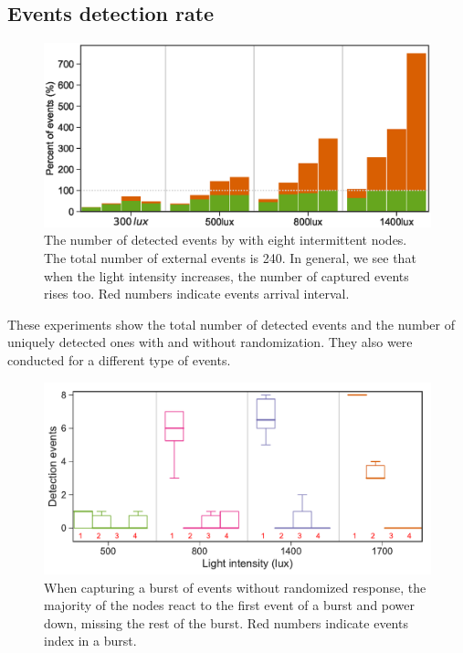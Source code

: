 \subsection{Events detection rate}
%
\begin{figure}[t]
		\centering
	    \includegraphics[width=\columnwidth]{figures/regular_events_capture_rate.eps}
    	\caption{The number of detected events by \fullcim with eight intermittent nodes. The total number of external events is 240. In general, we see that when the light intensity increases, the number of captured events rises too. Red numbers indicate events arrival interval.}
    	\label{fig:events_detection_rate}
\end{figure} 
These experiments show the total number of detected events and the number of uniquely detected ones with and without randomization. They also were conducted for a different type of events. 
%
\begin{figure}[t]
    \includegraphics[width=\columnwidth]{figures/events_burst_problem.pdf}
	\caption{When capturing a burst of events without randomized response, the majority of the nodes react to the first event of a burst and power down, missing the rest of the burst. Red numbers indicate events index in a burst.}
    \label{fig:events_burst_problem}
\end{figure}


